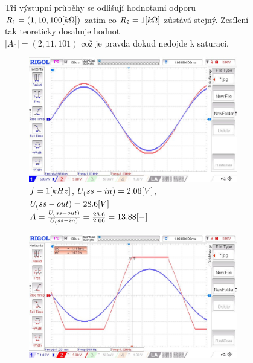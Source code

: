 \documentclass{article}
\begin{document}
\begin{figure}[H]
\begin{minipage}[t]{0.25\textwidth}
    Tři výstupní průběhy se odlišují hodnotami odporu \(R_1 = (1, 10, 100\-[k\Omega])\) zatím co \(R_2 = 1\-[k\Omega]\) zůstává stejný.
    Zesílení tak teoreticky dosahuje hodnot \\\(|A_0| = (2, 11, 101)\) což je pravda dokud nedojde k saturaci.
  \end{minipage}
  \begin{figure}[H]
    \begin{minipage}[t]{0.49\textwidth}
      \includegraphics[width=\textwidth]{LAB/NewFile11.jpg}
      \\
      \vspace{1mm}
      \(f = 1\-[kHz]\), \(U_(ss-in) = 2.06\-[V]\), \(U_(ss-out) = 28.6\-[V]\)\\
      \(A = \frac{U_(ss-out)}{U_(ss-in)} = \frac{28.6}{2.06} = 13.88\-[-]\)
    \end{minipage}
    \hfill
    \begin{minipage}[t]{0.49\textwidth}
      \includegraphics[width=\textwidth]{LAB/NewFile08.jpg}
      \\

\end{minipage}
\end{figure}
\end{figure}
\end{document}
